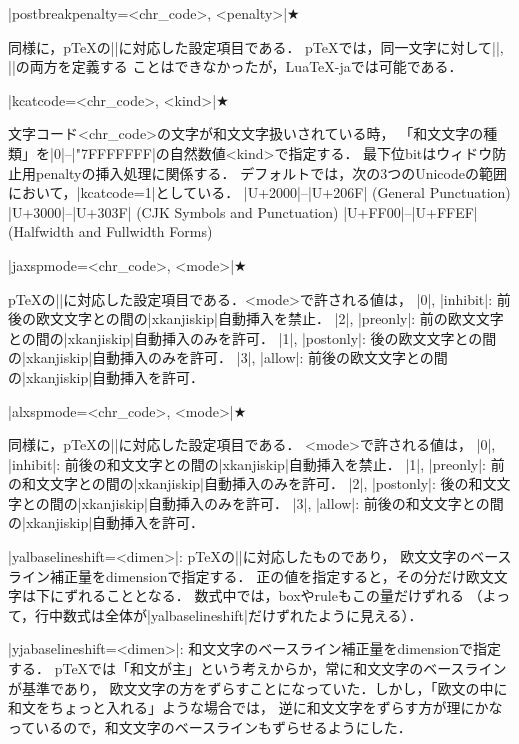 \item |postbreakpenalty={<chr_code>, <penalty>}|★\par\noindent
同様に，p\TeX の|\postbreakpenalty|に対応した設定項目である．
p\TeX では，同一文字に対して|\prebreakpenalty|, |\postbreakpenalty|の両方を定義する
ことはできなかったが，Lua\TeX-jaでは可能である．

\item |kcatcode={<chr_code>, <kind>}|★\par\noindent
文字コード<chr_code>の文字が和文文字扱いされている時，
「和文文字の種類」を|0|--|"7FFFFFFF|の自然数値<kind>で指定する．%
\itemitem 最下位bitはウィドウ防止用penaltyの挿入処理に関係する．
\itemitem デフォルトでは，次の3つのUnicodeの範囲において，|kcatcode=1|としている．
\itemT |U+2000|--|U+206F| (General Punctuation)
\itemT |U+3000|--|U+303F| (CJK Symbols and Punctuation)
\itemT |U+FF00|--|U+FFEF| (Halfwidth and Fullwidth Forms)

\item |jaxspmode={<chr_code>, <mode>}|★\par\noindent
p\TeX の|\inhibitxspcode|に対応した設定項目である．<mode>で許される値は，
\itemitem |0|, |inhibit|: 前後の欧文文字との間の|xkanjiskip|自動挿入を禁止．
\itemitem |2|, |preonly|: 前の欧文文字との間の|xkanjiskip|自動挿入のみを許可．
\itemitem |1|, |postonly|: 後の欧文文字との間の|xkanjiskip|自動挿入のみを許可．
\itemitem |3|, |allow|: 前後の欧文文字との間の|xkanjiskip|自動挿入を許可．
\item |alxspmode={<chr_code>, <mode>}|★\par\noindent
同様に，p\TeX の|\xspcode|に対応した設定項目である．
<mode>で許される値は，
\itemitem |0|, |inhibit|: 前後の和文文字との間の|xkanjiskip|自動挿入を禁止．
\itemitem |1|, |preonly|: 前の和文文字との間の|xkanjiskip|自動挿入のみを許可．
\itemitem |2|, |postonly|: 後の和文文字との間の|xkanjiskip|自動挿入のみを許可．
\itemitem |3|, |allow|: 前後の和文文字との間の|xkanjiskip|自動挿入を許可．

\item |yalbaselineshift=<dimen>|:
p\TeX の|\ybaselineshift|に対応したものであり，
欧文文字のベースライン補正量をdimensionで指定する．
\itemitem 正の値を指定すると，その分だけ欧文文字は下にずれることとなる．
\itemitem 数式中では，boxやruleもこの量だけずれる\hfil\break
（よって，行中数式は全体が|yalbaselineshift|だけずれたように見える）．
\item |yjabaselineshift=<dimen>|:
和文文字のベースライン補正量をdimensionで指定する．
p\TeX では「和文が主」という考えからか，常に和文文字のベースラインが基準であり，
欧文文字の方をずらすことになっていた．しかし，「欧文の中に和文をちょっと入れる」ような場合では，
逆に和文文字をずらす方が理にかなっているので，和文文字のベースラインもずらせるようにした．

